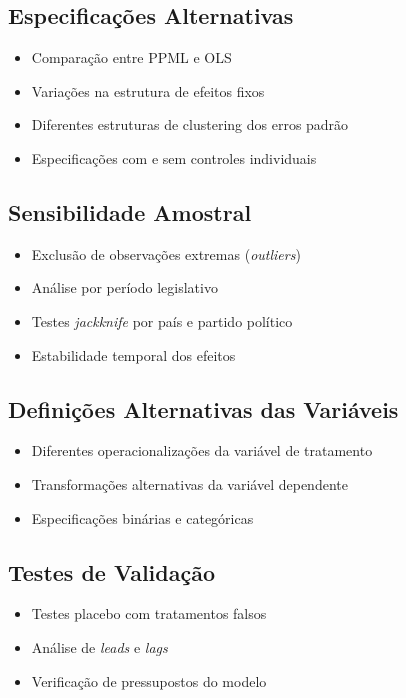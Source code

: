 \subsection{Especificações Alternativas}
\begin{itemize}
    \item Comparação entre PPML e OLS
    \item Variações na estrutura de efeitos fixos
    \item Diferentes estruturas de clustering dos erros padrão
    \item Especificações com e sem controles individuais
\end{itemize}

\subsection{Sensibilidade Amostral}
\begin{itemize}
    \item Exclusão de observações extremas (\textit{outliers})
    \item Análise por período legislativo
    \item Testes \textit{jackknife} por país e partido político
    \item Estabilidade temporal dos efeitos
\end{itemize}

\subsection{Definições Alternativas das Variáveis}
\begin{itemize}
    \item Diferentes operacionalizações da variável de tratamento
    \item Transformações alternativas da variável dependente
    \item Especificações binárias e categóricas
\end{itemize}

\subsection{Testes de Validação}
\begin{itemize}
    \item Testes placebo com tratamentos falsos
    \item Análise de \textit{leads} e \textit{lags}
    \item Verificação de pressupostos do modelo
\end{itemize}

